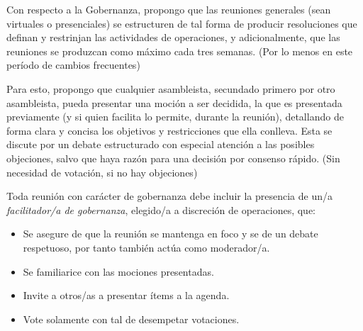 \documentclass[justified]{tufte-handout} %
\begin{document}
Con respecto a la Gobernanza, propongo que las reuniones generales (sean virtuales o presenciales) se estructuren de tal forma de producir resoluciones que definan y restrinjan las actividades de operaciones, y adicionalmente, que las reuniones se produzcan como máximo cada tres semanas. (Por lo menos en este período de cambios frecuentes)

Para esto, propongo que cualquier asambleista, secundado primero por otro asambleista, pueda presentar una moción a ser decidida, la que es presentada previamente (y si quien facilita lo permite, durante la reunión), detallando de forma clara y concisa los objetivos y restricciones que ella conlleva. Esta se discute por un debate estructurado con especial atención a las posibles objeciones, salvo que haya razón para una decisión por consenso rápido. (Sin necesidad de votación, si no hay objeciones)

Toda reunión con carácter de gobernanza debe incluir la presencia de un/a \textit{facilitador/a de gobernanza}, elegido/a a discreción de operaciones, que:

\begin{itemize}
	\item Se asegure de que la reunión se mantenga en foco y se de un debate respetuoso, por tanto también actúa como moderador/a.
	\item Se familiarice con las mociones presentadas.
	\item Invite a otros/as a presentar ítems a la agenda.
	\item Vote solamente con tal de desempetar votaciones.
\end{itemize}
\end{document}
